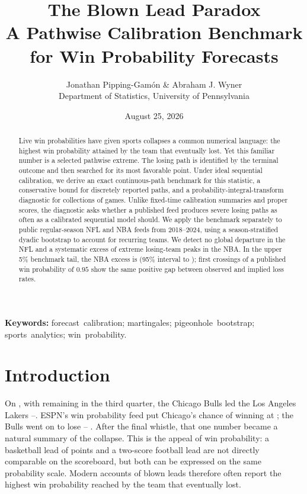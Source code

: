 \documentclass[12pt,letterpaper]{article}  %
\title{The Blown Lead Paradox\\[0.25em]\large A Pathwise Calibration Benchmark for Win Probability Forecasts}
\author{Jonathan Pipping-Gam\'on \& Abraham J. Wyner\\
{\small Department of Statistics, University of Pennsylvania}}
\date{August 25, 2026}
\theoremstyle{plain}
\theoremstyle{definition}
\begin{document}
\maketitle

\begin{abstract}
Live win probabilities have given sports collapses a common numerical language: the highest win probability attained by the team that eventually lost. Yet this familiar number is a selected pathwise extreme. The losing path is identified by the terminal outcome and then searched for its most favorable point. Under ideal sequential calibration, we derive an exact continuous-path benchmark for this statistic, a conservative bound for discretely reported paths, and a probability-integral-transform diagnostic for collections of games. Unlike fixed-time calibration summaries and proper scores, the diagnostic asks whether a published feed produces severe losing paths as often as a calibrated sequential model should. We apply the benchmark separately to public regular-season NFL and NBA feeds from 2018--2024, using a season-stratified dyadic bootstrap to account for recurring teams. We detect no global departure in the NFL and a systematic excess of extreme losing-team peaks in the NBA\@. In the upper 5\% benchmark tail, the NBA excess is \NBATailNinetyFiveExcess{} (95\% interval \NBATailNinetyFiveCILower{} to \NBATailNinetyFiveCIUpper{}); first crossings of a published win probability of $0.95$ show the same positive gap between observed and implied loss rates.
\end{abstract}

{\small\noindent\textbf{Keywords:} \mbox{forecast calibration}; martingales; \mbox{pigeonhole bootstrap}; \mbox{sports analytics}; \mbox{win probability}.\par}

\section{Introduction}

On \ChicagoDate, with \ChicagoClock{} remaining in the third quarter, the Chicago Bulls led the Los Angeles Lakers \ChicagoPeakHomeScore--\ChicagoPeakAwayScore{}.
ESPN's win probability feed put Chicago's chance of winning at \ChicagoMaxWP{}; the Bulls went on to lose \ChicagoFinalHomeScore--\ChicagoFinalAwayScore{} \citep{ESPN2019BullsLakers}.
After the final whistle, that one number became a natural summary of the collapse.
This is the appeal of win probability: a basketball lead of \ChicagoPeakLead{} points and a two-score football lead are not directly comparable on the scoreboard, but both can be expressed on the same probability scale.
Modern accounts of blown leads therefore often report the highest win probability reached by the team that eventually lost.
\end{document}
